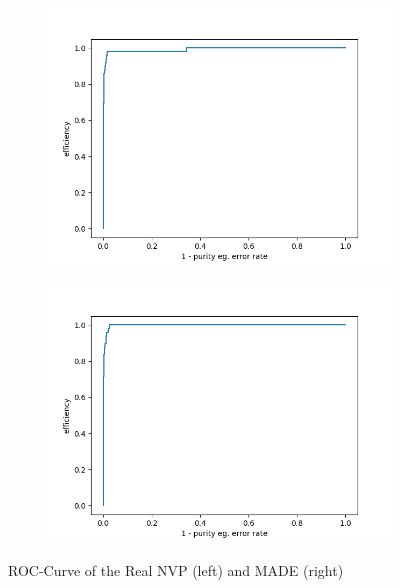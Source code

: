 \documentclass[%
 reprint,
 amsmath,amssymb,
 aps,
]{revtex4-2}
\begin{document}
 \begin{figure}[ht]
	\centering
	\begin{subfigure}[h]{0.4\textwidth}
		\centering
		\includegraphics[width=\textwidth]{figs/ROC_validation_Real_NVP.png}
	\end{subfigure}
	\hfill
	\begin{subfigure}[h]{0.4\textwidth}  
		\centering 
		\includegraphics[width=\textwidth]{figs/ROC_validation_MADE.png}
	\end{subfigure}
	\caption[ ROC-Curve of the Real NVP (left) and MADE (right)]
	{\small ROC-Curve of the Real NVP (left) and MADE (right)} 
	\label{fig:ROC}
\end{figure}
\end{document}
